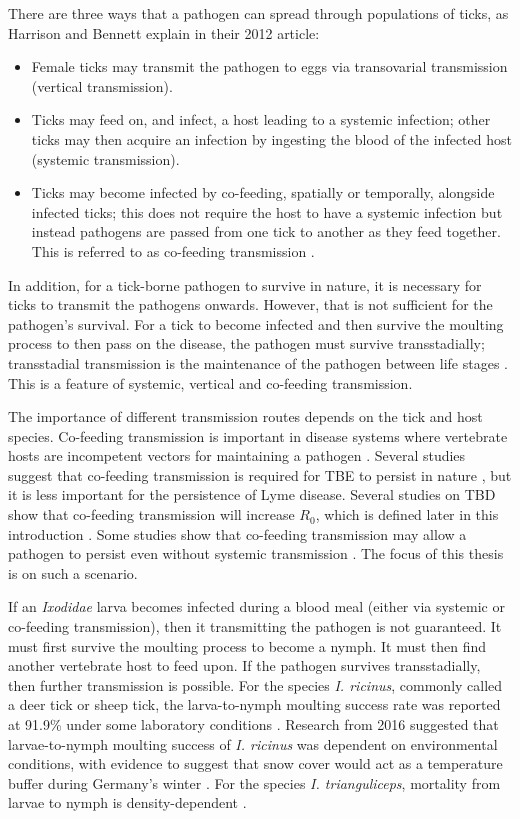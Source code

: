 \documentclass{article}
\begin{document}
There are three ways that a pathogen can spread through populations of ticks, as Harrison and Bennett explain in their 2012 article:
\begin{itemize}
	\item Female ticks may transmit the pathogen to eggs via transovarial transmission (vertical transmission).
	\item Ticks may feed on, and infect, a host leading to a systemic infection; other ticks may then acquire an infection by ingesting the blood of the infected host (systemic transmission).
	\item Ticks may become infected by co-feeding, spatially or temporally, alongside infected ticks; this does not require the host to have a systemic infection but instead pathogens are passed from one tick to another as they feed together. This is referred to as co-feeding transmission \cite{HARRISON2012}.
\end{itemize}

In addition, for a tick-borne pathogen to survive in nature, it is necessary for ticks to transmit the pathogens onwards. However, that is not sufficient for the pathogen's survival. For a tick to become infected and then survive the moulting process to then pass on the disease, the pathogen must survive transstadially; transstadial transmission is the maintenance of the pathogen between life stages \cite{Johnson2023d}. This is a feature of systemic, vertical and co-feeding transmission.

The importance of different transmission routes depends on the tick and host species. Co-feeding transmission is important in disease systems where vertebrate hosts are incompetent vectors for maintaining a pathogen \cite{HARRISON2012}. Several studies suggest that co-feeding transmission is required for TBE to persist in nature \cite{Hartemink2008, HARRISON2012}, but it is less important for the persistence of Lyme disease. Several studies on TBD show that co-feeding transmission will increase $ R_0 $, which is defined later in this introduction \cite{JohnstoneRobertson2020, Rosa2003, Norman2004}. Some studies show that co-feeding transmission may allow a pathogen to persist even without systemic transmission \cite{Rosa2003, Norman2004}. The focus of this thesis is on such a scenario.

If an \textit{Ixodidae} larva becomes infected during a blood meal (either via systemic or co-feeding transmission), then it transmitting the pathogen is not guaranteed. It must first survive the moulting process to become a nymph. It must then find another vertebrate host to feed upon. If the pathogen survives transstadially, then further transmission is possible. For the species \textit{I. ricinus}, commonly called a deer tick or sheep tick, the larva-to-nymph moulting success rate was reported at 91.9\% under some laboratory conditions \cite{Hurry2021}. Research from 2016 suggested that larvae-to-nymph moulting success of \textit{I. ricinus} was dependent on environmental conditions, with evidence to suggest that snow cover would act as a temperature buffer during Germany's winter \cite{Dautel2016}. For the species \textit{I. trianguliceps}, mortality from larvae to nymph is density-dependent \cite{Randolph1994}.
\end{document}
